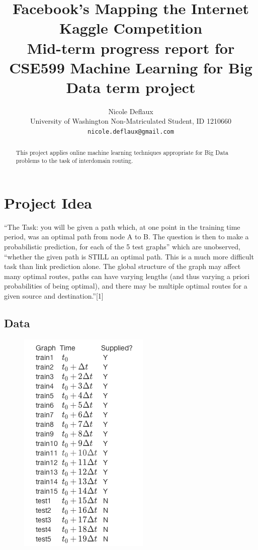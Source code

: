 \documentclass{article} %
\title{Facebook's Mapping the Internet Kaggle Competition \\
{\small Mid-term progress report for CSE599 Machine Learning for Big Data term project}}
\author{Nicole Deflaux \\
University of Washington Non-Matriculated Student, ID 1210660 \\
\texttt{nicole.deflaux@gmail.com}
}
\begin{document}
\maketitle

\begin{abstract}
  This project applies online machine learning techniques appropriate for
  Big Data problems to the task of interdomain routing.
\end{abstract}

\section{Project Idea}
``The Task: you will be given a path which, at one point in the training time
period, was an optimal path from node A to B. The question is then to make a
probabilistic prediction, for each of the 5 test graphs'' which are
unobserved, ``whether the given path is STILL an optimal path.  This is a
much more difficult task than link prediction alone. The global structure of
the graph may affect many optimal routes, paths can have varying lengths
(and thus varying a priori probabilities of being optimal), and there may be
multiple optimal routes for a given source and destination.''[1]

\subsection{Data}

\begin{figure}
  \begin{center}
    \includegraphics[scale=.5]{trainAndTestGraphs.png}
  \end{center}
\end{figure}
\end{document}
